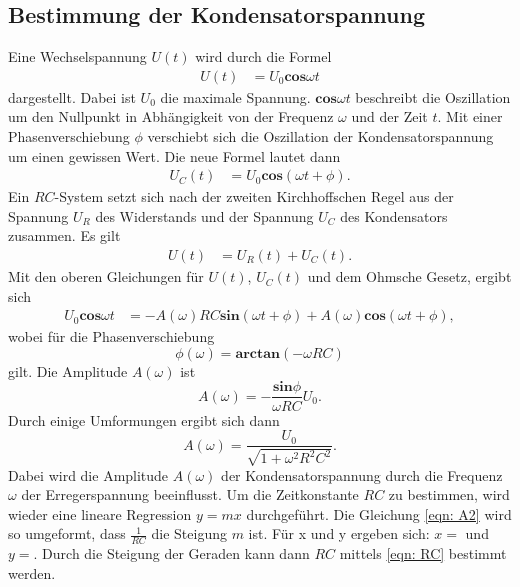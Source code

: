 \subsection{Bestimmung der Kondensatorspannung} %
Eine Wechselspannung $U(t)$ wird durch die Formel 
\begin{align*} 
    U(t)&= U_{0} \mathbf{cos}\omega t 
\end{align*}
dargestellt. Dabei ist $U_{0}$ die maximale Spannung. $\mathbf{cos}\omega t$ beschreibt die Oszillation um den Nullpunkt in Abhängigkeit von der Frequenz $\omega$ und der Zeit $t$. 
Mit einer Phasenverschiebung $\phi$ verschiebt sich die Oszillation der Kondensatorspannung um einen gewissen Wert. Die neue Formel lautet dann 
\begin{align*} 
    U_{C}(t)&= U_{0} \mathbf{cos}(\omega t + \phi).
\end{align*}
Ein $RC$-System setzt sich nach der zweiten Kirchhoffschen Regel aus der Spannung $U_{R}$ des Widerstands und der Spannung $U_{C}$ des Kondensators zusammen.
Es gilt 
\begin{align*} 
    U(t) &= U_{R}(t) + U_{C}(t).
\end{align*}
Mit den oberen Gleichungen für $U(t)$, $U_{C}(t)$ und dem Ohmsche Gesetz, ergibt sich 
\begin{align*} 
U_{0} \mathbf{cos}\omega t &= -A(\omega) RC \mathbf{sin}(\omega t + \phi) + A(\omega) \mathbf{cos}(\omega t + \phi),  
\end{align*}
wobei für die Phasenverschiebung 
\begin{equation} 
\phi (\omega) = \mathbf{arctan}(-\omega RC) 
\label{eqn: phi}
\end{equation}
gilt. Die Amplitude $A(\omega)$ ist
\begin{equation} 
    A(\omega) = - \frac{\mathbf{sin}\phi}{\omega RC} U_{0}.
    \label{eqn: A1}
\end{equation}
Durch einige Umformungen ergibt sich dann 
\begin{equation}
A(\omega) = \frac{U_{0}}{\sqrt{1 + \omega^2 R^2 C^2}}.
\label{eqn: A2}
\end{equation}
Dabei wird die Amplitude $A(\omega)$ der Kondensatorspannung durch die Frequenz $\omega$ der Erregerspannung beeinflusst.
Um die Zeitkonstante $RC$ zu bestimmen, wird wieder eine lineare Regression $y=mx$ durchgeführt. %
Die Gleichung \eqref{eqn: A2} wird so umgeformt, dass $\frac{1}{RC}$ die Steigung $m$ ist.
Für x und y ergeben sich: $x=$ und $y=$. %
Durch die Steigung der Geraden kann dann $RC$ mittels \eqref{eqn: RC} bestimmt werden.

